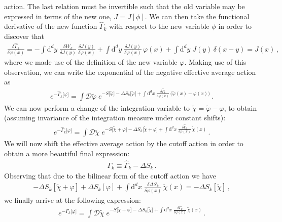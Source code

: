\documentclass[11pt]{book}
\numberwithin{equation}{chapter}
\begin{document}
action. The last relation must be invertible such that the old
variable may be expressed in terms of the new one, $J=J[\phi]$.
We can then take the functional derivative of the new function
$\hat \Gamma_k$ with respect to the new variable $\phi$ in order
to discover that
\begin{align}
  \frac{ \delta \hat \Gamma_k }{ \delta \varphi (x) }
  = - \int \mathrm d^dy \; \frac{ \delta W_k }{ \delta J(y) } \,
  \frac{ \delta J(y) }{ \delta \varphi(x) }
  + \int \mathrm d^dy \; \frac{ \delta J(y) }{ \delta \varphi(x) } \, \varphi(x)
  + \int \mathrm d^dy \; J(y) \, \delta(x-y)
  = J(x) \,,
\end{align}
where we made use of the definition of the new variable $\varphi$. Making
use of this observation, we can write the exponential of the negative
effective average action as
\begin{align}
  e^{ - \hat \Gamma_k \lbrack \varphi \rbrack }
  = \int \mathcal D \tilde \varphi \;
  e^{
    - S \lbrack \tilde \varphi \rbrack
    - \Delta S_k \lbrack \tilde \varphi \rbrack
    + \int \mathrm d^dx \;
    \frac{ \delta \hat \Gamma_k }{ \delta \varphi (x) }
    \, \big( \tilde \varphi(x) - \varphi(x) \big)
  } \,.
\end{align}
We can now perform a change of the integration variable
to $\tilde \chi = \tilde \varphi - \varphi$, to obtain
(assuming invariance of the integration measure under
constant shifts):
\begin{align}
  e^{ - \hat \Gamma_k \lbrack \varphi \rbrack }
  = \int \mathcal D \tilde \chi \;
  e^{
    - S \lbrack \tilde \chi + \varphi \rbrack
    - \Delta S_k \lbrack \tilde \chi + \varphi \rbrack
    + \int \mathrm d^dx \;
    \frac{ \delta \hat \Gamma_k }{ \delta \varphi (x) }
    \, \tilde \chi(x)
  } \,.
\end{align}
We will now shift the effective average action by the
cutoff action in order to obtain a more beautiful final
expression:
\begin{align}
  \Gamma_k \equiv \hat \Gamma_k - \Delta S_k \,.
\end{align}
Observing that due to the bilinear form of the cutoff action
we have
\begin{align}
  - \Delta S_k [ \tilde \chi + \varphi ]
  + \Delta S_k [ \varphi ]
  + \int \mathrm d^dx \;
  \frac{ \delta \Delta S_k }{ \delta \varphi (x) }
  \, \tilde \chi(x)
  = - \Delta S_k [ \tilde \chi ] \,,
\end{align}
we finally arrive at the following expression:
\begin{align}
  e^{ - \Gamma_k \lbrack \varphi \rbrack }
  = \int \mathcal D \tilde \chi \;
  e^{
    - S \lbrack \tilde \chi + \varphi \rbrack
    - \Delta S_k \lbrack \tilde \chi \rbrack
    + \int \mathrm d^dx \;
    \frac{ \delta \Gamma_k }{ \delta \varphi (x) }
    \, \tilde \chi(x)
  } \,.
\end{align}
\end{document}
